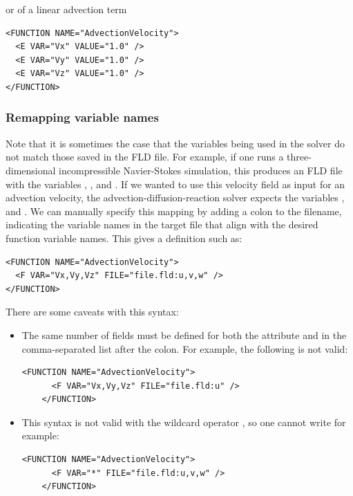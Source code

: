or of a linear advection term

\begin{lstlisting}[style=XMLStyle]
<FUNCTION NAME="AdvectionVelocity">
  <E VAR="Vx" VALUE="1.0" />
  <E VAR="Vy" VALUE="1.0" />
  <E VAR="Vz" VALUE="1.0" />
</FUNCTION>
\end{lstlisting}

\subsubsection{Remapping variable names}

Note that it is sometimes the case that the variables being used in the solver
do not match those saved in the FLD file. For example, if one runs a
three-dimensional incompressible Navier-Stokes simulation, this produces an FLD
file with the variables , ,  and . If we
wanted to use this velocity field as input for an advection velocity, the
advection-diffusion-reaction solver expects the variables , 
and . We can manually specify this mapping by adding a colon to the
filename, indicating the variable names in the target file that align with the
desired function variable names. This gives a definition such as:

\begin{lstlisting}[style=XMLStyle]
<FUNCTION NAME="AdvectionVelocity">
  <F VAR="Vx,Vy,Vz" FILE="file.fld:u,v,w" />
</FUNCTION>
\end{lstlisting}

There are some caveats with this syntax:

\begin{itemize}
  \item The same number of fields must be defined for both the 
  attribute and in the comma-separated list after the colon. For example, the
  following is not valid:
  \begin{lstlisting}[style=XMLStyle,gobble=4]
    <FUNCTION NAME="AdvectionVelocity">
      <F VAR="Vx,Vy,Vz" FILE="file.fld:u" />
    </FUNCTION>\end{lstlisting}
  \item This syntax is not valid with the wildcard operator \inltt{*}, so one
  cannot write for example:
  \begin{lstlisting}[style=XMLStyle,gobble=4]
    <FUNCTION NAME="AdvectionVelocity">
      <F VAR="*" FILE="file.fld:u,v,w" />
    </FUNCTION>
  \end{lstlisting}
\end{itemize}


